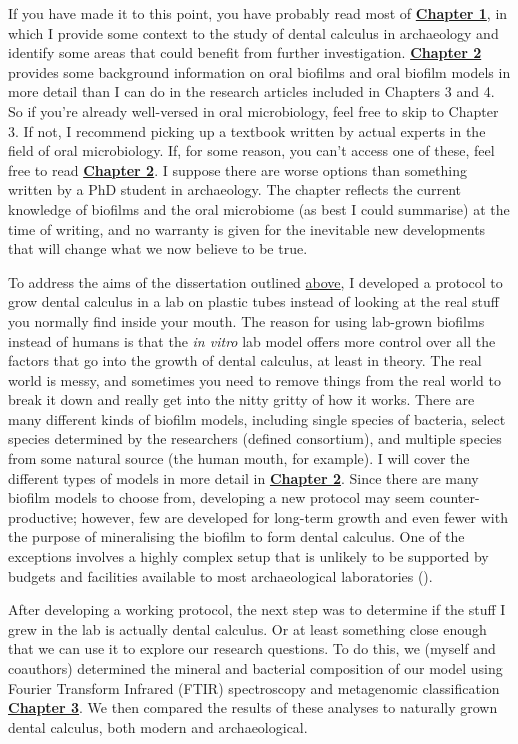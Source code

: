 \documentclass[
  b5paper,
]{book}
\begin{document}
If you have made it to this point, you have probably read most of
\hyperref[chap-intro]{\textbf{Chapter 1}}, in which I provide some
context to the study of dental calculus in archaeology and identify some
areas that could benefit from further investigation.
\hyperref[chap-background]{\textbf{Chapter 2}} provides some background
information on oral biofilms and oral biofilm models in more detail than
I can do in the research articles included in Chapters 3 and 4. So if
you're already well-versed in oral microbiology, feel free to skip to
Chapter 3. If not, I recommend picking up a textbook written by actual
experts in the field of oral microbiology. If, for some reason, you
can't access one of these, feel free to read
\hyperref[chap-background]{\textbf{Chapter 2}}. I suppose there are
worse options than something written by a PhD student in archaeology.
The chapter reflects the current knowledge of biofilms and the oral
microbiome (as best I could summarise) at the time of writing, and no
warranty is given for the inevitable new developments that will change
what we now believe to be true.

To address the aims of the dissertation outlined
\hyperref[intro-aims]{above}, I developed a protocol to grow dental
calculus in a lab on plastic tubes instead of looking at the real stuff
you normally find inside your mouth. The reason for using lab-grown
biofilms instead of humans is that the \emph{in vitro} lab model offers
more control over all the factors that go into the growth of dental
calculus, at least in theory. The real world is messy, and sometimes you
need to remove things from the real world to break it down and really
get into the nitty gritty of how it works. There are many different
kinds of biofilm models, including single species of bacteria, select
species determined by the researchers (defined consortium), and multiple
species from some natural source (the human mouth, for example). I will
cover the different types of models in more detail in
\hyperref[background]{\textbf{Chapter 2}}. Since there are many biofilm
models to choose from, developing a new protocol may seem
counter-productive; however, few are developed for long-term growth and
even fewer with the purpose of mineralising the biofilm to form dental
calculus. One of the exceptions involves a highly complex setup that is
unlikely to be supported by budgets and facilities available to most
archaeological laboratories
().

After developing a working protocol, the next step was to determine if
the stuff I grew in the lab is actually dental calculus. Or at least
something close enough that we can use it to explore our research
questions. To do this, we (myself and coauthors) determined the mineral
and bacterial composition of our model using Fourier Transform Infrared
(FTIR) spectroscopy and metagenomic classification
\hyperref[byoc-valid]{\textbf{Chapter 3}}. We then compared the results
of these analyses to naturally grown dental calculus, both modern and
archaeological.
\end{document}
